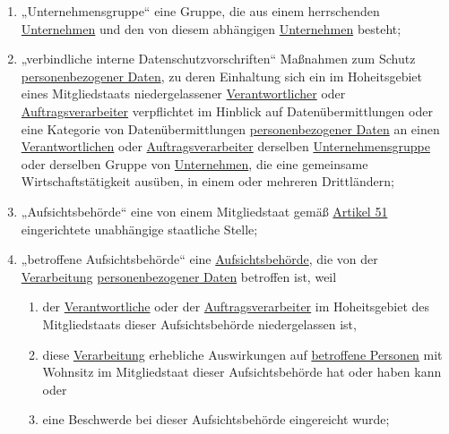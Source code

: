 \begin{enumerate}
  \item „Unternehmensgruppe“ eine Gruppe, die aus einem herrschenden \hyperref[itm:04-18]{Unternehmen} und den von diesem abhängigen
   \hyperref[itm:04-18]{Unternehmen} besteht;
  \label{itm:04-19}

  \item „verbindliche interne Datenschutzvorschriften“ Maßnahmen zum Schutz \hyperref[itm:04-1]{personenbezogener Daten}, zu deren Einhaltung
   sich ein im Hoheitsgebiet eines Mitgliedstaats niedergelassener \hyperref[itm:04-7]{Verantwortlicher} oder \hyperref[itm:04-8]{Auftragsverarbeiter}
   verpflichtet im Hinblick auf Datenübermittlungen oder eine Kategorie von Datenübermittlungen \hyperref[itm:04-1]{personenbezogener Daten}
   an einen \hyperref[itm:04-7]{Verantwortlichen} oder \hyperref[itm:04-8]{Auftragsverarbeiter} derselben \hyperref[itm:04-19]{Unternehmensgruppe} oder derselben Gruppe von
   \hyperref[itm:04-18]{Unternehmen}, die eine gemeinsame Wirtschaftstätigkeit ausüben, in einem oder mehreren Drittländern;
  \label{itm:04-20}

  \item „Aufsichtsbehörde“ eine von einem Mitgliedstaat gemäß \hyperref[ch:51]{Artikel 51} eingerichtete unabhängige
   staatliche Stelle;
  \label{itm:04-21}   

  \item „betroffene Aufsichtsbehörde“ eine \hyperref[itm:42-21]{Aufsichtsbehörde}, die von der \hyperref[itm:04-2]
   {Verarbeitung} \hyperref[itm:04-1]{personenbezogener Daten} betroffen ist, weil
  \label{itm:04-22}

  \begin{enumerate}

    \item der \hyperref[itm:04-7]{Verantwortliche} oder der \hyperref[itm:04-8]{Auftragsverarbeiter} im Hoheitsgebiet des Mitgliedstaats dieser Aufsichtsbehörde
     niedergelassen ist,
    \label{itm:04-22a}

    \item diese \hyperref[itm:04-2]{Verarbeitung} erhebliche Auswirkungen auf \hyperref[itm:04-1]{betroffene Personen} mit Wohnsitz im Mitgliedstaat dieser
     Aufsichtsbehörde hat oder haben kann oder
    \label{itm:04-22b}

    \item eine Beschwerde bei dieser Aufsichtsbehörde eingereicht wurde;
  \label{itm:04-22c}

  \end{enumerate}


\end{enumerate}
